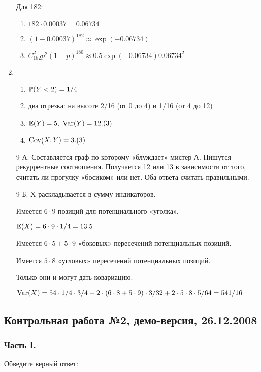 \begin{enumerate}
Для 182:
\begin{enumerate}
\item $182\cdot 0.00037=0.06734$
\item $(1-0.00037)^182\approx \exp(-0.06734)$
\item $C_{182}^{2}p^{2}(1-p)^{180}\approx 0.5\exp(-0.06734)0.06734^2$
\end{enumerate}
\item
\begin{enumerate}
\item $\P(Y<2)=1/4$
\item два отрезка: на высоте 2/16 (от 0 до 4) и 1/16 (от 4 до 12)
\item $\E(Y)=5$, $\Var(Y)=12.(3)$
\item $\Cov(X,Y)=3.(3)$
\end{enumerate}
\item[9-А.] Составляется граф по которому «блуждает» мистер А. Пишутся рекуррентные соотношения.
Получается 12 или 13 в зависимости от того, считать ли прогулку «босиком» или нет.
Оба ответа считать правильными.
\item[9-Б.] X раскладывается в сумму индикаторов.

Имеется $6\cdot9$ позиций для потенциального «уголка».

$\E(X)=6\cdot9\cdot1/4=13.5$

Имеется $6\cdot5+5\cdot9$ «боковых» пересечений потенциальных позиций.

Имеется $5\cdot8$ «угловых» пересечений потенциальных позиций.

Только они и могут дать ковариацию.

$\Var(X)=54\cdot1/4\cdot3/4+2\cdot(6\cdot8+5\cdot9)\cdot3/32+2\cdot5\cdot8\cdot5/64=541/16$
\end{enumerate}



\subsection{Контрольная работа №2, демо-версия, 26.12.2008}

\subsubsection*{Часть I.}

Обведите верный ответ:

